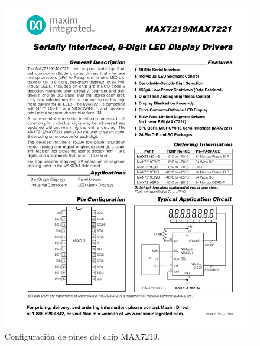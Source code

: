 \begin{figure}[ht!]
	\centering
	\begin{center}
	\includegraphics[scale=1.2]{imagenes/hw/max.pdf}
	 \caption{Configuración de pines del chip MAX7219.}
	  \label{fig:MAX-pines}
	\end{center}
\end{figure}

